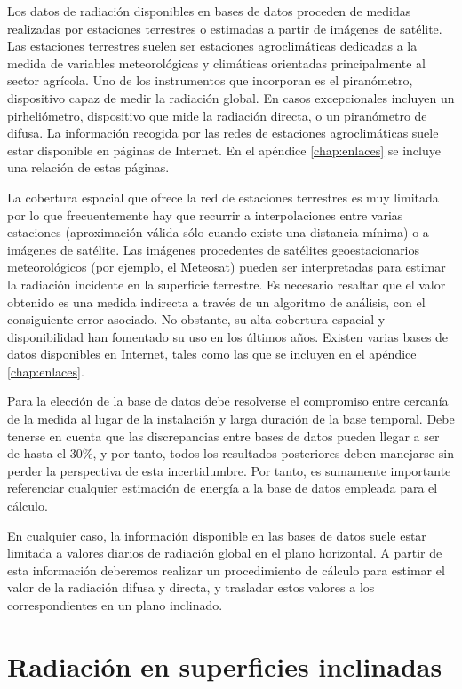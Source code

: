 Los datos de radiación disponibles en bases de datos proceden de medidas
realizadas por estaciones terrestres o estimadas a partir de imágenes
de satélite. Las estaciones terrestres suelen ser estaciones agroclimáticas
dedicadas a la medida de variables meteorológicas y climáticas orientadas
principalmente al sector agrícola. Uno de los instrumentos que incorporan
es el piranómetro, dispositivo capaz de medir la radiación global.
En casos excepcionales incluyen un pirheliómetro, dispositivo que
mide la radiación directa, o un piranómetro de difusa. La información
recogida por las redes de estaciones agroclimáticas suele estar disponible
en páginas de Internet. En el apéndice \ref{chap:enlaces} se incluye una
relación de estas páginas.

La cobertura espacial que ofrece la red de estaciones terrestres es
muy limitada por lo que frecuentemente hay que recurrir a interpolaciones
entre varias estaciones (aproximación válida sólo cuando existe una
distancia mínima) o a imágenes de satélite. Las imágenes procedentes
de satélites geoestacionarios meteorológicos (por ejemplo, el Meteosat)
pueden ser interpretadas para estimar la radiación incidente en la
superficie terrestre. Es necesario resaltar que el valor obtenido
es una medida indirecta a través de un algoritmo de análisis, con
el consiguiente error asociado. No obstante, su alta cobertura espacial
y disponibilidad han fomentado su uso en los últimos años. Existen
varias bases de datos disponibles en Internet, tales como las que se
incluyen en el apéndice \ref{chap:enlaces}.

Para la elección de la base de datos debe resolverse el compromiso
entre cercanía de la medida al lugar de la instalación y larga duración
de la base temporal. Debe tenerse en cuenta que las discrepancias
entre bases de datos pueden llegar a ser de hasta el 30\%, y por tanto,
todos los resultados posteriores deben manejarse sin perder la perspectiva
de esta incertidumbre. Por tanto, es sumamente importante referenciar
cualquier estimación de energía a la base de datos empleada para el
cálculo.

En cualquier caso, la información disponible en las bases de datos
suele estar limitada a valores diarios de radiación global en el plano
horizontal. A partir de esta información deberemos realizar un procedimiento
de cálculo para estimar el valor de la radiación difusa y directa,
y trasladar estos valores a los correspondientes en un plano inclinado.


\section{Radiación en superficies inclinadas}

